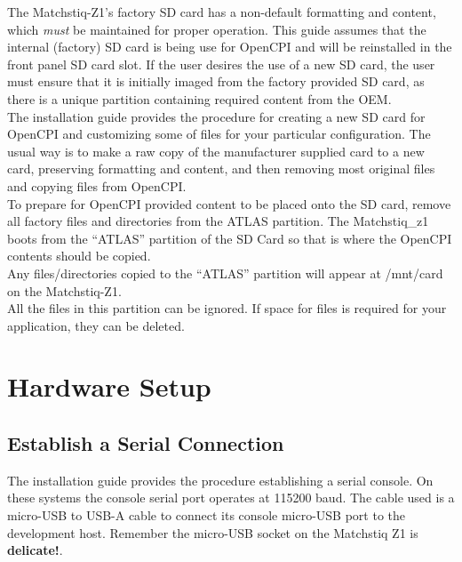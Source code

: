 The Matchstiq-Z1's factory SD card has a non-default formatting and content, which \textit{must} be maintained for proper operation. This guide assumes that the internal (factory) SD card is being use for OpenCPI and will be reinstalled in the front panel SD card slot. If the user desires the use of a new SD card, the user must ensure that it is initially imaged from the factory provided SD card, as there is a unique partition containing required content from the OEM.\\

The installation guide provides the procedure for creating a new SD card for OpenCPI and customizing some of files for your particular configuration.  The usual way is to make a raw copy of the manufacturer supplied card to a new card, preserving formatting and content, and then removing most original files and copying files from OpenCPI.\\

To prepare for OpenCPI provided content to be placed onto the SD card, remove all factory files and directories from the ATLAS partition.  The Matchstiq\_z1 boots from the ``ATLAS'' partition of the SD Card so that is where the OpenCPI contents should be copied.\\

Any files/directories copied to the ``ATLAS'' partition will appear at /mnt/card on the Matchstiq-Z1.\\

All the files in this partition can be ignored. If space for files is required for your application, they can be deleted.

\pagebreak
\section{Hardware Setup}

\subsection{Establish a Serial Connection}
The installation guide provides the procedure establishing a serial console.  On these systems the console serial port operates at 115200 baud.  The cable used is a micro-USB to USB-A cable to connect its  console micro-USB port to the development host.  Remember the micro-USB socket on the Matchstiq Z1 is \textbf{delicate!}.
